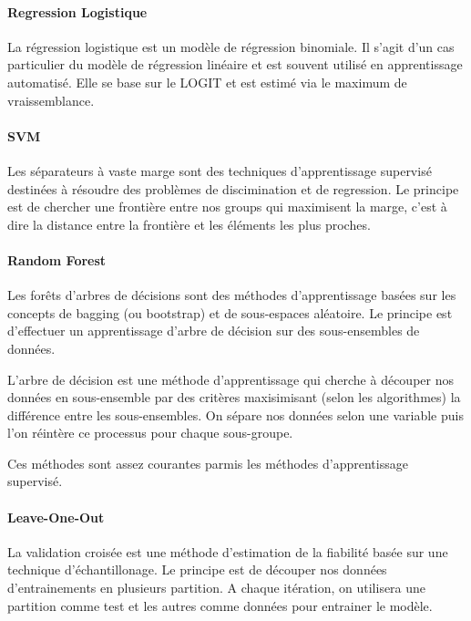 \documentclass[]{article}
\let\oldparagraph\paragraph
\renewcommand{\paragraph}[1]{\oldparagraph{#1}\mbox{}}
\begin{document}
\hypertarget{regression-logistique}{%
\paragraph{Regression Logistique}\label{regression-logistique}}

La régression logistique est un modèle de régression binomiale. Il
s'agit d'un cas particulier du modèle de régression linéaire et est
souvent utilisé en apprentissage automatisé. Elle se base sur le LOGIT
et est estimé via le maximum de vraissemblance.

\hypertarget{svm}{%
\paragraph{SVM}\label{svm}}

Les séparateurs à vaste marge sont des techniques d'apprentissage
supervisé destinées à résoudre des problèmes de discimination et de
regression. Le principe est de chercher une frontière entre nos groups
qui maximisent la marge, c'est à dire la distance entre la frontière et
les éléments les plus proches.

\hypertarget{random-forest}{%
\paragraph{Random Forest}\label{random-forest}}

Les forêts d'arbres de décisions sont des méthodes d'apprentissage
basées sur les concepts de bagging (ou bootstrap) et de sous-espaces
aléatoire. Le principe est d'effectuer un apprentissage d'arbre de
décision sur des sous-ensembles de données.

L'arbre de décision est une méthode d'apprentissage qui cherche à
découper nos données en sous-ensemble par des critères maxisimisant
(selon les algorithmes) la différence entre les sous-ensembles. On
sépare nos données selon une variable puis l'on réintère ce processus
pour chaque sous-groupe.

Ces méthodes sont assez courantes parmis les méthodes d'apprentissage
supervisé.

\hypertarget{leave-one-out}{%
\paragraph{Leave-One-Out}\label{leave-one-out}}

La validation croisée est une méthode d'estimation de la fiabilité basée
sur une technique d'échantillonage. Le principe est de découper nos
données d'entrainements en plusieurs partition. A chaque itération, on
utilisera une partition comme test et les autres comme données pour
entrainer le modèle.
\end{document}
